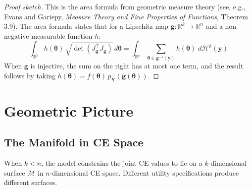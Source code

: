 \documentclass[11pt,a4paper]{article}
\theoremstyle{definition}
\newcommand{\btheta}{\boldsymbol{\theta}}
\begin{document}
\begin{proof}[Proof sketch]
This is the area formula from geometric measure theory (see, e.g., Evans and
Gariepy, \emph{Measure Theory and Fine Properties of Functions}, Theorem 3.9).
The area formula states that for a Lipschitz map $\mathbf{g}: \mathbb{R}^k
\to \mathbb{R}^n$ and a non-negative measurable function $h$:
\begin{equation}
    \int_{\mathbb{R}^k} h(\btheta) \,
    \sqrt{\det(J_{\mathbf{g}}^\top J_{\mathbf{g}})} \, d\btheta
    = \int_{\mathbb{R}^n} \sum_{\btheta \in \mathbf{g}^{-1}(\mathbf{y})}
    h(\btheta) \; d\mathcal{H}^k(\mathbf{y})
\end{equation}
When $\mathbf{g}$ is injective, the sum on the right has at most one term, and
the result follows by taking $h(\btheta) = f(\btheta) \,
p_{\mathbf{Y}}(\mathbf{g}(\btheta))$.
\end{proof}


\section{Geometric Picture}
\label{sec:geometry}

\subsection{The Manifold in CE Space}

When $k < n$, the model constrains the joint CE values to lie on a
$k$-dimensional surface $\mathcal{M}$ in $n$-dimensional CE space. Different
utility specifications produce different surfaces.
\end{document}
